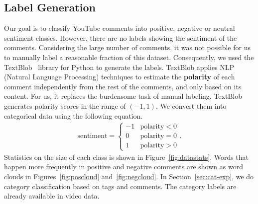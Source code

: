 \subsection{Label Generation}
\label{sec:label}
Our goal is to classify YouTube comments into positive, negative or neutral sentiment classes. However, there are no labels showing the sentiment of the comments. Considering the large number of comments, it was not possible for us to manually label a reasonable fraction of this dataset. Consequently, we used the TextBlob~\cite{textblob} library for Python to generate the labels. TextBlob applies NLP (Natural Language Processing) techniques to estimate the \textbf{polarity} of each comment independently from the rest of the comments, and only based on its content. For us, it replaces the burdensome task of manual labeling. TextBlob generates polarity scores in the range of $(-1,1)$. We convert them into categorical data using the following equation.
\begin{eqnarray*}
\textrm{sentiment}=
\begin{cases}
-1 & \textrm{polarity} < 0\\
0 & \textrm{polarity} = 0\\
1 & \textrm{polarity} > 0
\end{cases}.
\label{eq:sentiment}
\end{eqnarray*}
Statistics on the size of each class is shown in Figure~\ref{fig:datastats}.
Words that happen more frequently in positive and negative comments are shown as word clouds in Figures~\ref{fig:poscloud} and~\ref{fig:negcloud}.
In Section~\ref{sec:cat-exp}, we do category classification based on tags and comments. The category labels are already available in video data.

